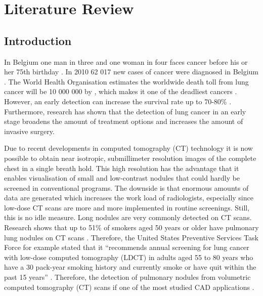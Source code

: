 \section{Literature Review}
\subsection{Introduction}
In Belgium one man in three and one woman in four faces cancer before his or
her 75th birthday \cite{kanker}. In 2010 62 017 new cases of cancer were
diagnosed in Belgium \cite{kankerliga}. The World Health Organisation estimates
the worldwide death toll from lung cancer will be 10 000 000 by , which makes it
one of the deadliest cancers \cite{gu, zheng}.
However, an early detection can increase the survival rate up to 70-80\% \cite{swensen}. Furthermore, research has shown that the detection of lung
cancer in an early stage broadens the amount of treatment options and increases
the amount of invasive surgery\cite{greenlee}.


Due to recent developments in
computed tomography (CT) technology it is now possible to obtain near isotropic, submillimeter resolution images of the complete chest in a single breath hold.
This high resolution has the advantage that it enables visualisation of small
and low-contrast nodules that could hardly be screened in conventional
programs. The downside is that enormous amounts of data are generated
which increases the work load of radiologists, especially since low-dose CT
scans are more and more implemented in routine screenings. Still, this is no
idle measure. Long nodules are very commonly detected on CT scans. Research
shows that up to 51\% of smokers aged 50 years or older have pulmonary lung nodules on CT scans \cite{mahon}.
Therefore, the United States Preventive Services Task Force for example stated that it ``recommends annual screening for lung cancer with low-dose computed tomography (LDCT) in adults aged 55 to 80 years who have a 30 pack-year smoking history and currently smoke or have quit
within the past 15 years'' \cite{ups}.
Therefore, the detection of pulmonary nodules from volumetric computed
tomography (CT) scans if one of the most studied CAD applications
\cite{sluimer}.


